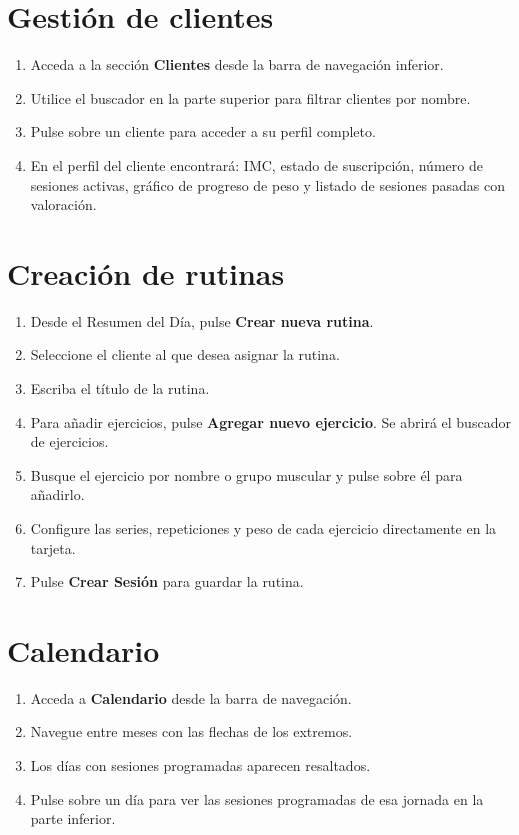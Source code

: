 \section{Gestión de clientes}

\begin{enumerate}
  \item Acceda a la sección \textbf{Clientes} desde la barra de navegación inferior.
  \item Utilice el buscador en la parte superior para filtrar clientes por nombre.
  \item Pulse sobre un cliente para acceder a su perfil completo.
  \item En el perfil del cliente encontrará: IMC, estado de suscripción, número de sesiones activas, gráfico de progreso de peso y listado de sesiones pasadas con valoración.
\end{enumerate}

\section{Creación de rutinas}

\begin{enumerate}
  \item Desde el Resumen del Día, pulse \textbf{Crear nueva rutina}.
  \item Seleccione el cliente al que desea asignar la rutina.
  \item Escriba el título de la rutina.
  \item Para añadir ejercicios, pulse \textbf{Agregar nuevo ejercicio}. Se abrirá el buscador de ejercicios.
  \item Busque el ejercicio por nombre o grupo muscular y pulse sobre él para añadirlo.
  \item Configure las series, repeticiones y peso de cada ejercicio directamente en la tarjeta.
  \item Pulse \textbf{Crear Sesión} para guardar la rutina.
\end{enumerate}

\section{Calendario}

\begin{enumerate}
  \item Acceda a \textbf{Calendario} desde la barra de navegación.
  \item Navegue entre meses con las flechas de los extremos.
  \item Los días con sesiones programadas aparecen resaltados.
  \item Pulse sobre un día para ver las sesiones programadas de esa jornada en la parte inferior.
\end{enumerate}

